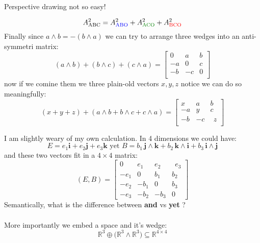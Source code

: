 \documentclass[12pt]{article}
\begin{document}
\newpage

\\
Perspective drawing not so easy!

$$ A^2_{\color{black}{\text{ABC}}} = 
A^2_{\color{blue}{\text{ABO}}}+
A^2_{\color{green!50!black}{\text{ACO}}}+
A^2_{\color{red}{\text{BCO}}} $$
Finally since $a \wedge b = - (b \wedge a)$ we can try to arrange three wedges into an anti-symmetri matrix:
$$ 
(a \wedge b) + (b \wedge c) + (c \wedge a)=
\left[\begin{array}{ccc} 
0 & a & b \\ 
-a & 0 & c \\
-b & -c & 0\\
\end{array}\right]
$$
now if we comine them we three plain-old vectors $x,y,z$ notice we can do so meaningfully:
$$
(x+y+z) + 
(a \wedge b + b \wedge c + c \wedge a)=
\left[\begin{array}{rrr} 
x & a & b \\ 
-a & y & c \\
-b & -c & \;\,z\\
\end{array}\right]
 $$
 \newpage
 
 \noindent I am slightly weary of my own calculation.  In 4 dimensions we could have:
$$ E = e_1 \mathbf{i}+  e_2\mathbf{j} +e_3\mathbf{k} \text{ yet } B = b_1 \,\mathbf{j}\wedge \mathbf{k} +  b_2\, \mathbf{k}\wedge \mathbf{i} +  b_3 \,\mathbf{i}\wedge \mathbf{j}$$
and these two vectors fit in a $4 \times 4$ matrix:
$$ (E,B) = \left[
\begin{array}{rrrr} 
0 \; & e_1 & e_2 & \;\, e_3 \\
-e_1 & 0 \;& b_1 & b_2 \\
-e_2 & -b_1 & 0 \; & b_3 \\
-e_3 & -b_2 & -b_3& 0 \;
\end{array}
 \right] $$
Semantically, what is the difference between \textbf{and} vs \textbf{yet} ? \\ \\
More importantly we embed a space and it's wedge:
$$\mathbb{R}^3 \oplus \big(\mathbb{R}^3\wedge \mathbb{R}^3\big)
\subseteq \mathbb{R}^{4 \times 4} $$
\end{document}
